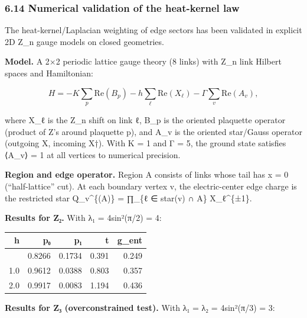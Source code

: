 \documentclass[
]{article}
\newcounter{none} %
\begin{document}
\subsubsection{6.14 Numerical validation of the heat-kernel
law}\label{numerical-validation-of-the-heat-kernel-law}

The heat-kernel/Laplacian weighting of edge sectors has been validated
in explicit 2D Z\_n gauge models on closed geometries.

\textbf{Model.} A 2×2 periodic lattice gauge theory (8 links) with Z\_n
link Hilbert spaces and Hamiltonian:

\[
H = -K \sum_p \mathrm{Re}(B_p) - h \sum_\ell \mathrm{Re}(X_\ell) - \Gamma \sum_v \mathrm{Re}(A_v),
\]

where X\_ℓ is the Z\_n shift on link ℓ, B\_p is the oriented plaquette
operator (product of Z's around plaquette p), and A\_v is the oriented
star/Gauss operator (outgoing X, incoming X†). With K = 1 and Γ = 5, the
ground state satisfies ⟨A\_v⟩ = 1 at all vertices to numerical
precision.

\textbf{Region and edge operator.} Region A consists of links whose tail
has x = 0 (``half-lattice'' cut). At each boundary vertex v, the
electric-center edge charge is the restricted star Q\_v\^{}\{(A)\} =
∏\_\{ℓ ∈ star(v) ∩ A\} X\_ℓ\^{}\{±1\}.

\textbf{Results for Z₂.} With λ₁ = 4sin²(π/2) = 4:

{\def\LTcaptype{none} %
\begin{longtable}[]{@{}rrrrr@{}}
\toprule\noalign{}
h & p₀ & p₁ & t & g\_ent \\
\midrule\noalign{}
\endhead
\bottomrule\noalign{}
\endlastfoot
0.5 & 0.8266 & 0.1734 & 0.391 & 0.249 \\
1.0 & 0.9612 & 0.0388 & 0.803 & 0.357 \\
2.0 & 0.9917 & 0.0083 & 1.194 & 0.436 \\
\end{longtable}
}

\textbf{Results for Z₃ (overconstrained test).} With λ₁ = λ₂ =
4sin²(π/3) = 3:
\end{document}
